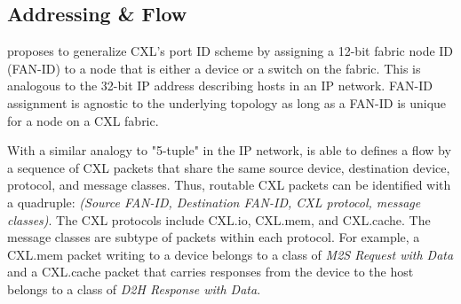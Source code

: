 \subsection{Addressing \& Flow}
%
\aurelia proposes to generalize CXL's port ID scheme by assigning a 12-bit fabric node ID (FAN-ID) to a node that is either a device or a switch on the fabric. 
%
This is analogous to the 32-bit IP address describing hosts in an IP network.
%
%
FAN-ID assignment is agnostic to the underlying topology as long as a FAN-ID is unique for a node on a CXL fabric. 
%
%

With a similar analogy to "5-tuple" in the IP network, \aurelia is able to defines a flow by a sequence of CXL packets that share the same source device, destination device, protocol, and message classes.
%
Thus, routable CXL packets can be identified with a quadruple: \emph{(Source FAN-ID, Destination FAN-ID, CXL protocol, message classes)}. The CXL protocols include CXL.io, CXL.mem, and CXL.cache. 
%
The message classes are subtype of packets within each protocol. 
%
For example, a CXL.mem packet writing to a device belongs to a class of \emph{M2S Request with Data} and a CXL.cache packet that carries responses from the device to the host belongs to a class of \emph{D2H Response with Data}.
%





